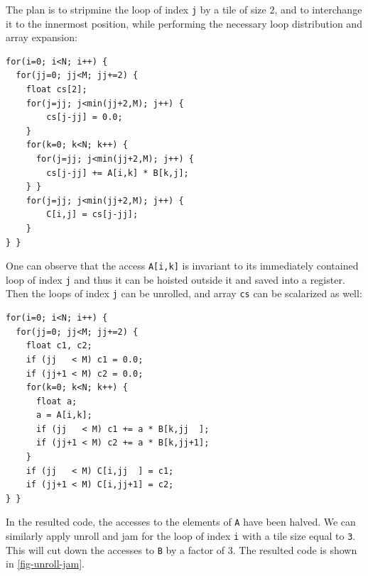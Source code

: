 \documentclass[acmsmall,review]{acmart}\settopmatter{printfolios=true,printccs=false,printacmref=false}
\begin{document}
\newpage
The plan is to stripmine the loop of index {\tt j} by a tile of 
size $2$, and to interchange it to the innermost position, while 
performing the necessary loop distribution and array expansion:
\begin{lstlisting}[mathescape=true]
for(i=0; i<N; i++) {
  for(jj=0; jj<M; jj+=2) {
    float cs[2];
    for(j=jj; j<min(jj+2,M); j++) {
        cs[j-jj] = 0.0;
    }
    for(k=0; k<N; k++) {
      for(j=jj; j<min(jj+2,M); j++) {
        cs[j-jj] += A[i,k] * B[k,j];
    } }
    for(j=jj; j<min(jj+2,M); j++) {
        C[i,j] = cs[j-jj];
    }
} }
\end{lstlisting}\vspace{-2ex}
One can observe that the access {\tt A[i,k]} is invariant to its
immediately contained loop of index {\tt j} and thus it can be hoisted
outside it and saved into a register. Then the loops of index {\tt j} 
can be unrolled, and array {\tt cs} can be scalarized as well:
\begin{lstlisting}[mathescape=true]
for(i=0; i<N; i++) {
  for(jj=0; jj<M; jj+=2) {
    float c1, c2;
    if (jj   < M) c1 = 0.0;
    if (jj+1 < M) c2 = 0.0;
    for(k=0; k<N; k++) {
      float a;
      a = A[i,k];
      if (jj   < M) c1 += a * B[k,jj  ];
      if (jj+1 < M) c2 += a * B[k,jj+1];
    }
    if (jj   < M) C[i,jj  ] = c1;
    if (jj+1 < M) C[i,jj+1] = c2;
} }
\end{lstlisting}\vspace{-2ex}
In the resulted code, the accesses to the elements of {\tt A} have
been halved.   We can similarly apply unroll and jam for the loop
of index {\tt i} with a tile size equal to {\tt 3}. This will cut down 
the accesses to {\tt B} by a factor of $3$. The resulted code 
is shown in \cref{fig-unroll-jam}. 
\end{document}
